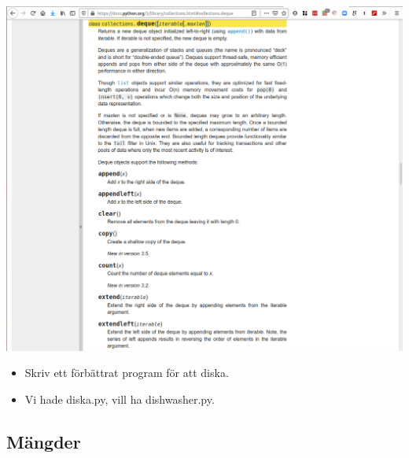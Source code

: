 \begin{frame}[fragile]
  \begin{example}[queue.py]
    \inputminted{python}{examples/queue.py}
  \end{example}
\end{frame}

\begin{frame}
  \includegraphics[width=\columnwidth]{figs/docs-deque.png}
\end{frame}

\begin{frame}[fragile]
  \begin{exercise}
    \begin{itemize}
      \item Skriv ett förbättrat program för att diska.
      \item Vi hade diska.py, vill ha dishwasher.py.
    \end{itemize}
  \end{exercise}
\end{frame}


\subsection{Mängder}

\begin{frame}[fragile]
  \begin{example}[sets.py]
    \inputminted{python}{examples/sets.py}
  \end{example}
\end{frame}


